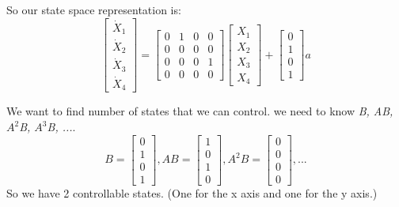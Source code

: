 \documentclass[10pt,letterpaper]{article}
\begin{document}
So our state space representation is:
\begin{equation}
\begin{bmatrix}
\dot{X}_1\\ 
\dot{X}_2\\
\dot{X}_3\\
\dot{X}_4
\end{bmatrix} = \begin{bmatrix}
0 & 1 & 0 & 0 \\
0 & 0 & 0 & 0\\
0 & 0 & 0 & 1\\
0 & 0 & 0 & 0
\end{bmatrix}  \begin{bmatrix}
X_1\\
X_2\\
X_3\\
X_4
\end{bmatrix} + \begin{bmatrix}
0\\
1\\
0\\
1
\end{bmatrix} a
\end{equation}

We want to find number of states that we can control. we need to know \emph{B, AB,$A^2$B, $A^3$B, ...}.
\begin{equation}
 B= \begin{bmatrix} 
0\\
1\\
0\\
1
\end{bmatrix}
,
 AB= \begin{bmatrix} 
1\\
0\\
1\\
0
\end{bmatrix}
,
 A^2B= \begin{bmatrix} 
0\\
0\\
0\\
0
\end{bmatrix}, ...
\end{equation}
So we have 2 controllable states. (One for the x axis and one for the y axis.)
\end{document}
